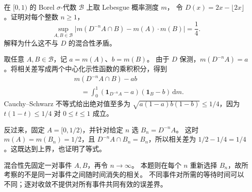 \begin{exercise}\label{b1:ex:32-mixing-not-uniform-in-events}
在 \([0,1)\) 的 Borel \(\sigma\)-代数 \(\mathcal B\) 上取 Lebesgue 概率测度 \(m\)，
令 \(D(x)=2x-\lfloor2x\rfloor\)。证明对每个整数 \(n\geq1\)，
\[
 \sup_{A,B\in\mathcal B}
 \bigl|m(D^{-n}A\cap B)-m(A)\cdot m(B)\bigr|=\frac14.
\]
解释为什么这不与 \(D\) 的混合性矛盾。
\end{exercise}
\begin{solution}
取任意 \(A,B\in\mathcal B\)，记 \(a=m(A)\)、\(b=m(B)\)。
由于 \(D\) 保测，\(m(D^{-n}A)=a\)。将相关差写成两个中心化示性函数的乘积积分，得到
\[
 \begin{aligned}
 &m(D^{-n}A\cap B)-ab\\
 &\quad=\int_0^1(\mathbf1_{D^{-n}A}-a)
                     (\mathbf1_B-b)\,\mathrm dm.
 \end{aligned}
\]
Cauchy--Schwarz 不等式给出绝对值至多为
\(\sqrt{a(1-a)b(1-b)}\leq1/4\)，因为 \(t(1-t)\leq1/4\) 对 \(0\leq t\leq1\) 成立。

反过来，固定 \(A=[0,1/2)\)，并针对给定 \(n\) 选 \(B_n=D^{-n}A\)。
这时 \(m(A)=m(B_n)=1/2\)，且 \(D^{-n}A\cap B_n=B_n\)，所以相关差为
\(1/2-1/4=1/4\)。这既达到上界，也证明了等式。

混合性先固定一对事件 \(A,B\)，再令 \(n\to\infty\)。
本题则在每个 \(n\) 重新选择 \(B_n\)，故所考察的不是同一对事件之间随时间消失的相关。
不同事件对所需的等待时间可以不同；逐对收敛不提供对所有事件共同有效的误差界。
\end{solution}


